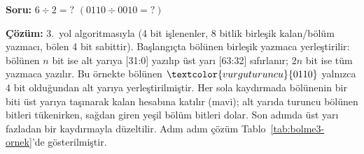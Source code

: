 \begin{ornek}[5.12]
\textbf{Soru:} $6 \div 2 = ?$ \quad $(0110 \div 0010 = ?)$

\textbf{Çözüm:} 3.\ yol algoritmasıyla (4 bit işlenenler, 8 bitlik birleşik kalan/bölüm yazmacı, bölen 4 bit sabittir). Başlangıçta bölünen birleşik yazmaca yerleştirilir: bölünen $n$ bit ise alt yarıya [31:0] yazılıp üst yarı [63:32] sıfırlanır; $2n$ bit ise tüm yazmaca yazılır. Bu örnekte bölünen $\textcolor{vurguturuncu}{0110}$ yalnızca 4 bit olduğundan alt yarıya yerleştirilmiştir. Her sola kaydırmada bölünenin bir biti üst yarıya taşınarak kalan hesabına katılır (\textcolor{vurgumavi}{mavi}); alt yarıda \textcolor{vurguturuncu}{turuncu} bölünen bitleri tükenirken, sağdan giren \textcolor{vurguyesil}{yeşil} bölüm bitleri dolar. Son adımda üst yarı fazladan bir kaydırmayla düzeltilir. Adım adım çözüm Tablo~\ref{tab:bolme3-ornek}'de gösterilmiştir.


\end{ornek}
